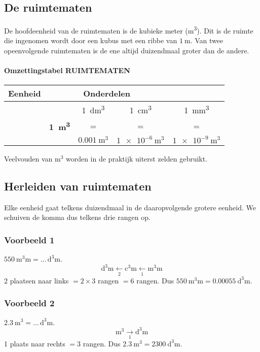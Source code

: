 \documentclass[a4paper,12pt]{article}
\begin{document}
\subsection{De ruimtematen}
De hoofdeenheid van de ruimtematen is de kubieke meter (\si{\cubic\metre}). Dit is de ruimte die ingenomen wordt door een kubus met een ribbe van \(\SI{1}{\metre}\). Van twee opeenvolgende ruimtematen is de ene altijd duizendmaal groter dan de andere.

\paragraph{Omzettingstabel RUIMTEMATEN}
\renewcommand{\arraystretch}{1.2}
\begin{center}
\setlength{\fboxsep}{4pt}\setlength{\fboxrule}{0.5pt}%
\begin{tabular}{*{5}{c}}
  \textbf{Eenheid} & \multicolumn{3}{c}{\textbf{Onderdelen}}\\
  \midrule
& & \SI{1}{\cubic\deci\metre} & \SI{1}{\cubic\centi\metre} & \SI{1}{\cubic\milli\metre}\\
& \textbf{\SI{1}{\cubic\metre}} & = & = & =\\
& & \(\SI{0.001}{\cubic\metre}\) & \(\SI{1e-6}{\cubic\metre}\) & \(\SI{1e-9}{\cubic\metre}\)
\end{tabular}
\end{center}

Veelvouden van \(\si{\cubic\metre}\) worden in de praktijk uiterst zelden gebruikt.

\subsection{Herleiden van ruimtematen}
Elke eenheid gaat telkens duizendmaal in de daaropvolgende grotere eenheid. We schuiven de komma dus telkens drie rangen op.

\subsubsection*{Voorbeeld 1}
\(\SI{550}{\cubic\milli\metre}=\ldots\,\si{\cubic\deci\metre}\).\\
\[
\si{\cubic\deci\metre} \xleftarrow[2]{}\si{\cubic\centi\metre} \xleftarrow[1]{}\si{\cubic\milli\metre}
\]
2 plaatsen naar links \(=2\times3\) rangen \(=6\) rangen. Dus \(\SI{550}{\cubic\milli\metre}=\SI{0.00055}{\cubic\deci\metre}\).

\subsubsection*{Voorbeeld 2}
\(\SI{2.3}{\cubic\metre}=\ldots\,\si{\cubic\deci\metre}\).\\
\[
\si{\cubic\metre} \xrightarrow[1]{}\si{\cubic\deci\metre}
\]
1 plaats naar rechts \(=3\) rangen. Dus \(\SI{2.3}{\cubic\metre}=\SI{2300}{\cubic\deci\metre}\).
\end{document}
